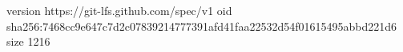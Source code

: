 version https://git-lfs.github.com/spec/v1
oid sha256:7468cc9e647c7d2c07839214777391afd41faa22532d54f01615495abbd221d6
size 1216
